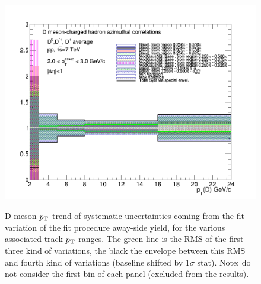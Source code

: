 \begin{figure}[!htbp]
{\includegraphics[width=0.48\linewidth, height=0.33\linewidth]{figures/FitOutput/BaselineSystematicSourcesASYield_pthad2to3.png}}
\caption{D-meson $p_{\rm T}$ trend of systematic uncertainties coming from the fit variation of the fit procedure away-side yield, for the various associated track $p_{\rm T}$ ranges. The green line is the RMS of the first three kind of variations, the black the envelope between this RMS and fourth kind of variations (baseline shifted by 1$\sigma$ stat). Note: do not consider the first bin of each panel (excluded from the results).}
\label{fig:ASyieldUnc}
\end{figure}
